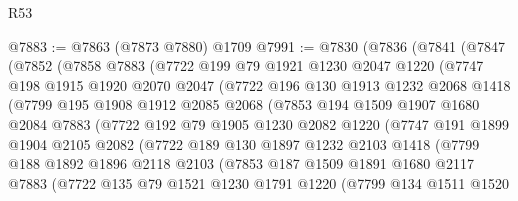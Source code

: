 \begin{lexlean}{R53}
\begin{coremodule}
@7883 := @7863 (@7873 @7880) @1709
@7991 := @7830
    (@7836
      (@7841
        (@7847
          (@7852
            (@7858
              @7883
              (@7722
                @199
                @79
                @1921
                @1230
                @2047
                @1220
                (@7747
                  @198
                  @1915
                  @1920
                  @2070
                  @2047
                  (@7722
                    @196
                    @130
                    @1913
                    @1232
                    @2068
                    @1418
                    (@7799
                      @195
                      @1908
                      @1912
                      @2085
                      @2068
                      (@7853
                        @194
                        @1509
                        @1907
                        @1680
                        @2084
                        @7883
                        (@7722
                          @192
                          @79
                          @1905
                          @1230
                          @2082
                          @1220
                          (@7747
                            @191
                            @1899
                            @1904
                            @2105
                            @2082
                            (@7722
                              @189
                              @130
                              @1897
                              @1232
                              @2103
                              @1418
                              (@7799
                                @188
                                @1892
                                @1896
                                @2118
                                @2103
                                (@7853
                                  @187
                                  @1509
                                  @1891
                                  @1680
                                  @2117
                                  @7883
                                  (@7722
                                    @135
                                    @79
                                    @1521
                                    @1230
                                    @1791
                                    @1220
                                    (@7799
                                      @134
                                      @1511
                                      @1520

\end{coremodule}
\end{lexlean}
